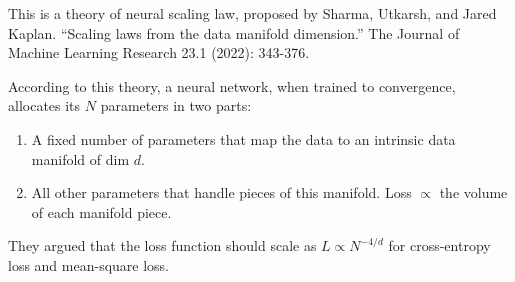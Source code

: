 
This is a theory of neural scaling law, proposed by Sharma, Utkarsh,
and Jared Kaplan. ``Scaling laws from the data manifold dimension.'' The
Journal of Machine Learning Research 23.1 (2022): 343-376.

According to this theory, a neural network, when trained to convergence,
allocates its \(N\) parameters in two parts: 
\begin{enumerate}
    \item A fixed number of
parameters that map the data to an intrinsic data manifold of dim \(d\).
    \item All other parameters that handle pieces of this manifold. Loss
\(\propto\) the volume of each manifold piece.
\end{enumerate}

They argued that the loss function should scale as
\(L \propto N^{-4/d}\) for cross-entropy loss and mean-square loss.

